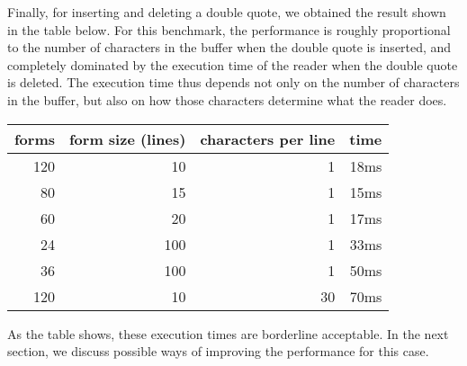 Finally, for inserting and deleting a double quote, we obtained the
result shown in the table below.  For this benchmark, the performance
is roughly proportional to the number of characters in the buffer when
the double quote is inserted, and completely dominated by the
execution time of the reader when the double quote is deleted.  The
execution time thus depends not only on the number of characters in
the buffer, but also on how those characters determine what the reader
does.

\vskip 0.3cm
\begin{tabular}{|r|r|r|r|}
\hline
forms & form size (lines) & characters per line & time\\
\hline
120 & 10 & 1 & 18ms\\
80 & 15  & 1 & 15ms\\
60 & 20  & 1 & 17ms\\
24 & 100 & 1 & 33ms\\
36 & 100 & 1 & 50ms\\
120 & 10 & 30 & 70ms\\
\hline
\end{tabular}
\vskip 0.3cm

\noindent
As the table shows, these execution times are borderline acceptable.
In the next section, we discuss possible ways of improving the
performance for this case.
